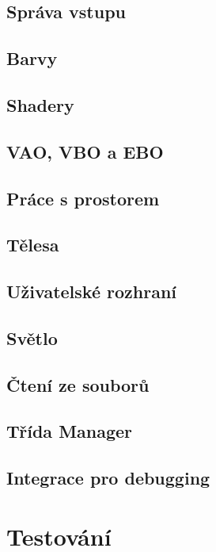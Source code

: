 \documentclass[12pt]{article}
\begin{document}
\subsection{Správa vstupu}

\subsection{Barvy}

\subsection{Shadery}

\subsection{VAO, VBO a EBO}

\subsection{Práce s prostorem}

\subsection{Tělesa}

\subsection{Uživatelské rozhraní}

\subsection{Světlo}

\subsection{Čtení ze souborů}

\subsection{Třída Manager}

\subsection{Integrace pro debugging}

\section{Testování}
\end{document}
